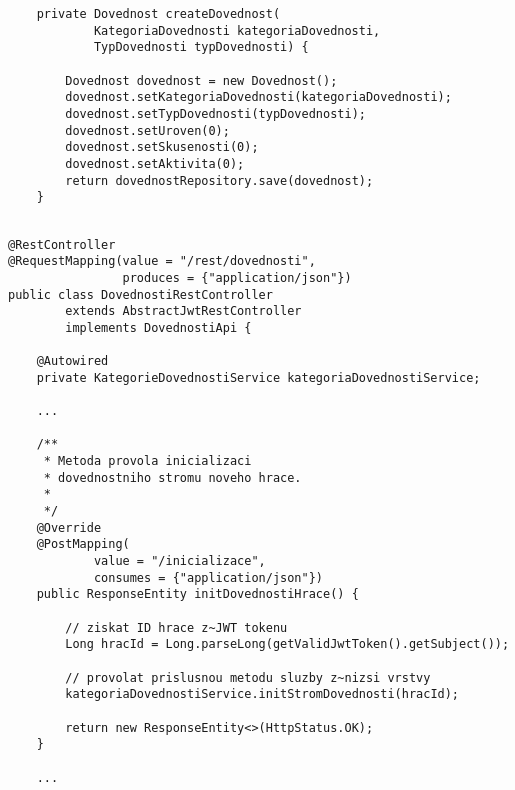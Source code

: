 \documentclass[twoside, 12pt]{article}
\begin{document}
{{\begin{lstlisting}
    private Dovednost createDovednost(
            KategoriaDovednosti kategoriaDovednosti,
            TypDovednosti typDovednosti) {

        Dovednost dovednost = new Dovednost();
        dovednost.setKategoriaDovednosti(kategoriaDovednosti);
        dovednost.setTypDovednosti(typDovednosti);
        dovednost.setUroven(0);
        dovednost.setSkusenosti(0);
        dovednost.setAktivita(0);
        return dovednostRepository.save(dovednost);
    }


\end{lstlisting}

\clearpage


\begin{lstlisting}
@RestController
@RequestMapping(value = "/rest/dovednosti",
                produces = {"application/json"})
public class DovednostiRestController
        extends AbstractJwtRestController
        implements DovednostiApi {

    @Autowired
    private KategorieDovednostiService kategoriaDovednostiService;

    ...

    /**
     * Metoda provola inicializaci
     * dovednostniho stromu noveho hrace.
     *
     */
    @Override
    @PostMapping(
            value = "/inicializace",
            consumes = {"application/json"})
    public ResponseEntity initDovednostiHrace() {

        // ziskat ID hrace z~JWT tokenu
        Long hracId = Long.parseLong(getValidJwtToken().getSubject());

        // provolat prislusnou metodu sluzby z~nizsi vrstvy
        kategoriaDovednostiService.initStromDovednosti(hracId);

        return new ResponseEntity<>(HttpStatus.OK);
    }

    ...

\end{lstlisting}

\clearpage


\vspace{10}



\vspace{10}

}}
\end{document}
